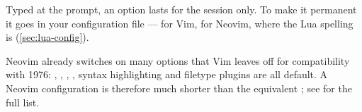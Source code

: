 Typed at the \key{:} prompt, an option lasts for the session only. To make it
permanent it goes in your configuration file --- 
for Vim,  for Neovim, where the Lua
spelling is  (\autoref{sec:lua-config}).

\begin{remark}
	Neovim already switches on many options that Vim leaves off for compatibility
	with 1976: , , ,
	, syntax highlighting and filetype plugins are all default.
	A Neovim configuration is therefore much shorter than the equivalent
	; see  for the full list.
\end{remark}
